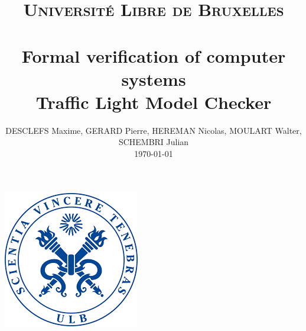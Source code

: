 \documentclass[paper=a4, fontsize=11pt]{scrartcl}
\title{
		\usefont{OT1}{bch}{b}{n}
		\normalfont \normalsize \textsc{Universit\'e Libre de Bruxelles} \\ [25pt]
		\horrule{0.5pt} \\[0.4cm]
		\huge Formal verification of computer systems \\
		\normalsize Traffic Light Model Checker
		\horrule{2pt} \\[0.5cm]
}
\author{
		\normalfont 								\normalsize
        DESCLEFS Maxime, GERARD Pierre, HEREMAN Nicolas,
 MOULART Walter, SCHEMBRI Julian\\[-3pt]		\normalsize
 \today
}
\date{}
\numberwithin{equation}{section}		%
\numberwithin{figure}{section}			%
\numberwithin{table}{section}				%
\begin{document}
\maketitle
\begin{center}
\includegraphics[scale = 1]{picture/ulb.png}
\end{center}
\newpage
\tableofcontents






\end{document}
